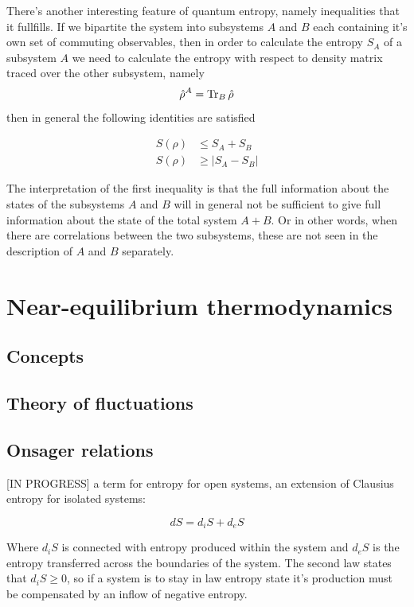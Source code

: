 \documentclass[a4paper,12pt]{article}
\begin{document}
There's another interesting feature of quantum entropy, namely inequalities that it fullfills.
If we bipartite the system into subsystems $A$ and $B$ each containing it's own set of commuting observables, then in order to calculate the entropy $S_A$ of a subsystem $A$ we need to calculate the entropy with respect to density matrix traced over the other subsystem, namely
\begin{equation}
  \hat{\rho}^A = \Tr_B \hat{\rho} 
\end{equation}
then in general the following identities are satisfied

\begin{equation}
\begin{aligned}
	S(\rho) &\leq S_A + S_B	\\
	S(\rho) &\geq \left| S_A - S_B \right|
\end{aligned}
\end{equation}

The interpretation of the first inequality is that the full information about the states of the subsystems $A$ and $B$ will in general not be sufficient to give full information about the state of the total system $A+B$. Or in other words, when there are correlations between the two subsystems, these are not seen in the description of $A$ and $B$ separately. 

\section{Near-equilibrium thermodynamics}

\subsection{Concepts}
\subsection{Theory of fluctuations}
\subsection{Onsager relations}
[IN PROGRESS]
a term for entropy for open systems, an extension of Clausius entropy for isolated systems:

\begin{displaymath}
	dS=d_iS+d_eS
\end{displaymath}


Where \(d_iS\) is connected with entropy produced within the system and \(d_eS\) is the entropy transferred across the boundaries of the system.
The second law states that \(d_iS\geq 0\), so if a system is to stay in law entropy state it{'}s production must be compensated by an inflow of negative
entropy.
\end{document}
